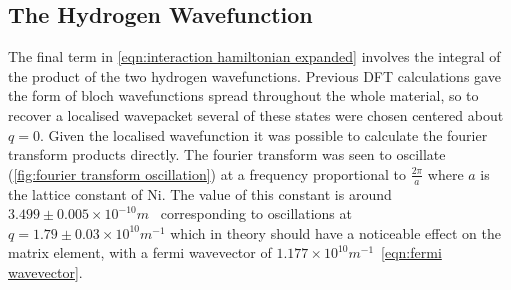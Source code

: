 \subsection{The Hydrogen Wavefunction}
The final term in
\cref{eqn:interaction hamiltonian expanded}
involves the integral
of the product of the two
hydrogen wavefunctions.
Previous DFT calculations
gave the form of bloch wavefunctions
spread throughout the whole
material\cite{Jianding-Zhu}, so
to recover a localised wavepacket
several of these states were chosen
centered about \(q=0\).
Given the localised wavefunction
it was possible to calculate the fourier
transform products directly. The fourier transform was seen to
oscillate (\cref{fig:fourier transform oscillation})
at a frequency proportional to
\(\frac{2\pi}{a}\) where \(a\) is the lattice
constant of Ni. The value of this constant
is around
\(3.499\pm{}0.005\times{}10^{-10}m\)~\cite{PhysRev.25.753}
corresponding to oscillations at
\(q = 1.79 \pm 0.03 \times{}10^{10}m^{-1}\)
which in theory should have a noticeable
effect on the matrix element, with a
fermi wavevector of
\(1.177\times{}10^{10} m^{-1}\)~\cref{eqn:fermi wavevector}.
